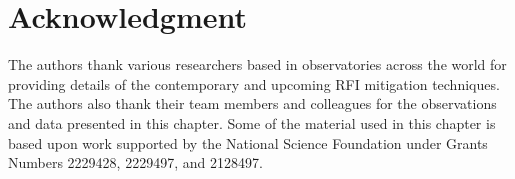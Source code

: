 \section{Acknowledgment}
\label{section:hardware:acknowledgment}
The authors thank various researchers based in observatories across the world for providing details of the contemporary and upcoming RFI mitigation techniques. The authors also thank their team members and colleagues for the observations and data presented in this chapter.
Some of the material used in this chapter is based upon work supported by the National Science Foundation under Grants Numbers 2229428, 2229497, and 2128497.